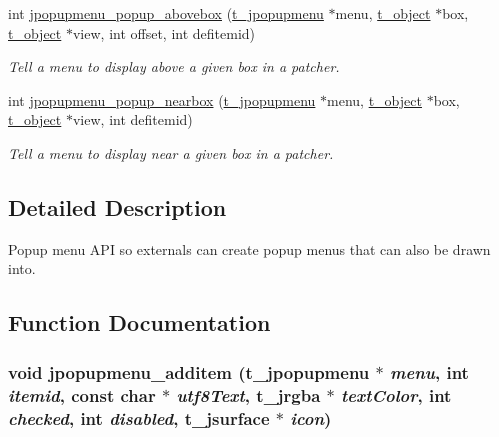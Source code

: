 \begin{DoxyCompactItemize}
int \hyperlink{group__jpopupmenu_ga18c3434bd119af47b3ec605b659c1654}{jpopupmenu\_\-popup\_\-abovebox} (\hyperlink{group__jgraphics_ga613e147be2f9655726f08f0896b9dbaa}{t\_\-jpopupmenu} $\ast$menu, \hyperlink{structt__object}{t\_\-object} $\ast$box, \hyperlink{structt__object}{t\_\-object} $\ast$view, int offset, int defitemid)
\begin{DoxyCompactList}\small\item\em Tell a menu to display above a given box in a patcher. \item\end{DoxyCompactList}\item 
int \hyperlink{group__jpopupmenu_gab7ff50b3fcc40c38c478f97b1848e099}{jpopupmenu\_\-popup\_\-nearbox} (\hyperlink{group__jgraphics_ga613e147be2f9655726f08f0896b9dbaa}{t\_\-jpopupmenu} $\ast$menu, \hyperlink{structt__object}{t\_\-object} $\ast$box, \hyperlink{structt__object}{t\_\-object} $\ast$view, int defitemid)
\begin{DoxyCompactList}\small\item\em Tell a menu to display near a given box in a patcher. \item\end{DoxyCompactList}\end{DoxyCompactItemize}


\subsection{Detailed Description}
Popup menu API so externals can create popup menus that can also be drawn into. 

\subsection{Function Documentation}
\hypertarget{group__jpopupmenu_ga1911796fed5dd59d3ab9a7471f6161a9}{
\subsubsection[{jpopupmenu\_\-additem}]{\setlength{\rightskip}{0pt plus 5cm}void jpopupmenu\_\-additem ({\bf t\_\-jpopupmenu} $\ast$ {\em menu}, \/  int {\em itemid}, \/  const char $\ast$ {\em utf8Text}, \/  {\bf t\_\-jrgba} $\ast$ {\em textColor}, \/  int {\em checked}, \/  int {\em disabled}, \/  {\bf t\_\-jsurface} $\ast$ {\em icon})}}
\label{group__jpopupmenu_ga1911796fed5dd59d3ab9a7471f6161a9}



